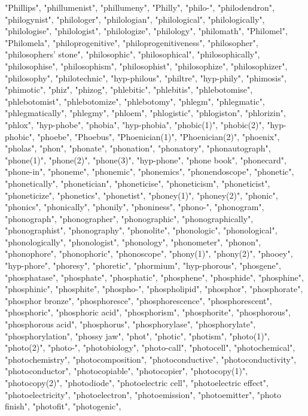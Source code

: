 "Phillips",
"phillumenist",
"phillumeny",
"Philly",
"philo-",
"philodendron",
"philogynist",
"philologer",
"philologian",
"philological",
"philologically",
"philologise",
"philologist",
"philologize",
"philology",
"philomath",
"Philomel",
"Philomela",
"philoprogenitive",
"philoprogenitiveness",
"philosopher",
"philosophers' stone",
"philosophic",
"philosophical",
"philosophically",
"philosophise",
"philosophism",
"philosophist",
"philosophize",
"philosophizer",
"philosophy",
"philotechnic",
"hyp-philous",
"philtre",
"hyp-phily",
"phimosis",
"phimotic",
"phiz",
"phizog",
"phlebitic",
"phlebitis",
"phlebotomise",
"phlebotomist",
"phlebotomize",
"phlebotomy",
"phlegm",
"phlegmatic",
"phlegmatically",
"phlegmy",
"phloem",
"phlogistic",
"phlogiston",
"phlorizin",
"phlox",
"hyp-phobe",
"phobia",
"hyp-phobia",
"phobic(1)",
"phobic(2)",
"hyp-phobic",
"phoebe",
"Phoebus",
"Phoenician(1)",
"Phoenician(2)",
"phoenix",
"pholas",
"phon",
"phonate",
"phonation",
"phonatory",
"phonautograph",
"phone(1)",
"phone(2)",
"phone(3)",
"hyp-phone",
"phone book",
"phonecard",
"phone-in",
"phoneme",
"phonemic",
"phonemics",
"phonendoscope",
"phonetic",
"phonetically",
"phonetician",
"phoneticise",
"phoneticism",
"phoneticist",
"phoneticize",
"phonetics",
"phonetist",
"phoney(1)",
"phoney(2)",
"phonic",
"phonics",
"phonically",
"phonily",
"phoniness",
"phono-",
"phonogram",
"phonograph",
"phonographer",
"phonographic",
"phonographically",
"phonographist",
"phonography",
"phonolite",
"phonologic",
"phonological",
"phonologically",
"phonologist",
"phonology",
"phonometer",
"phonon",
"phonophore",
"phonophoric",
"phonoscope",
"phony(1)",
"phony(2)",
"phooey",
"hyp-phore",
"phoresy",
"phoretic",
"phormium",
"hyp-phorous",
"phosgene",
"phosphatase",
"phosphate",
"phosphatic",
"phosphene",
"phosphide",
"phosphine",
"phosphinic",
"phosphite",
"phospho-",
"phospholipid",
"phosphor",
"phosphorate",
"phosphor bronze",
"phosphoresce",
"phosphorescence",
"phosphorescent",
"phosphoric",
"phosphoric acid",
"phosphorism",
"phosphorite",
"phosphorous",
"phosphorous acid",
"phosphorus",
"phosphorylase",
"phosphorylate",
"phosphorylation",
"phossy jaw",
"phot",
"photic",
"photism",
"photo(1)",
"photo(2)",
"photo-",
"photobiology",
"photo-call",
"photocell",
"photochemical",
"photochemistry",
"photocomposition",
"photoconductive",
"photoconductivity",
"photoconductor",
"photocopiable",
"photocopier",
"photocopy(1)",
"photocopy(2)",
"photodiode",
"photoelectric cell",
"photoelectric effect",
"photoelectricity",
"photoelectron",
"photoemission",
"photoemitter",
"photo finish",
"photofit",
"photogenic",
